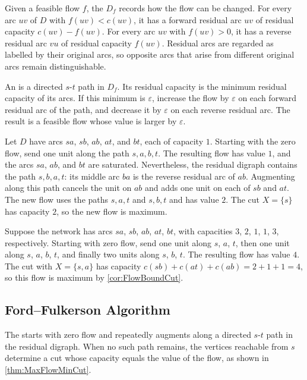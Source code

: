 Given a feasible flow $f$, the  $D_f$ records how the flow can be changed. For every arc $uv$ of $D$ with $f(uv)<c(uv)$, it has a forward residual arc $uv$ of residual capacity $c(uv)-f(uv)$. For every arc $uv$ with $f(uv)>0$, it has a reverse residual arc $vu$ of residual capacity $f(uv)$. Residual arcs are regarded as labelled by their original arcs, so opposite arcs that arise from different original arcs remain distinguishable.

An  is a directed $s$-$t$ path in $D_f$. Its residual capacity is the minimum residual capacity of its arcs. If this minimum is $\varepsilon$, increase the flow by $\varepsilon$ on each forward residual arc of the path, and decrease it by $\varepsilon$ on each reverse residual arc. The result is a feasible flow whose value is larger by $\varepsilon$.

\begin{Example}\label{ex:ReverseResidualArc}
Let $D$ have arcs $sa$, $sb$, $ab$, $at$, and $bt$, each of capacity $1$. Starting with the zero flow, send one unit along the path $s,a,b,t$. The resulting flow has value $1$, and the arcs $sa$, $ab$, and $bt$ are saturated. Nevertheless, the residual digraph contains the path $s,b,a,t$: its middle arc $ba$ is the reverse residual arc of $ab$. Augmenting along this path cancels the unit on $ab$ and adds one unit on each of $sb$ and $at$. The new flow uses the paths $s,a,t$ and $s,b,t$ and has value $2$. The cut $X = \{s\}$ has capacity $2$, so the new flow is maximum.
\end{Example}

\begin{Example}\label{ex:FlowAugment}
Suppose the network has arcs $sa$, $sb$, $ab$, $at$, $bt$, with capacities $3$, $2$, $1$, $1$, $3$, respectively. Starting with zero flow, send one unit along $s$, $a$, $t$, then one unit along $s$, $a$, $b$, $t$, and finally two units along $s$, $b$, $t$. The resulting flow has value $4$. The cut with $X = \{s, a\}$ has capacity $c(sb) + c(at) + c(ab) = 2 + 1 + 1 = 4$, so this flow is maximum by \cref{cor:FlowBoundCut}.
\end{Example}

\subsection{Ford--Fulkerson Algorithm}\label{subsec:FordFulkerson}

The  starts with zero flow and repeatedly augments along a directed $s$-$t$ path in the residual digraph. When no such path remains, the vertices reachable from $s$ determine a cut whose capacity equals the value of the flow, as shown in \cref{thm:MaxFlowMinCut}.

